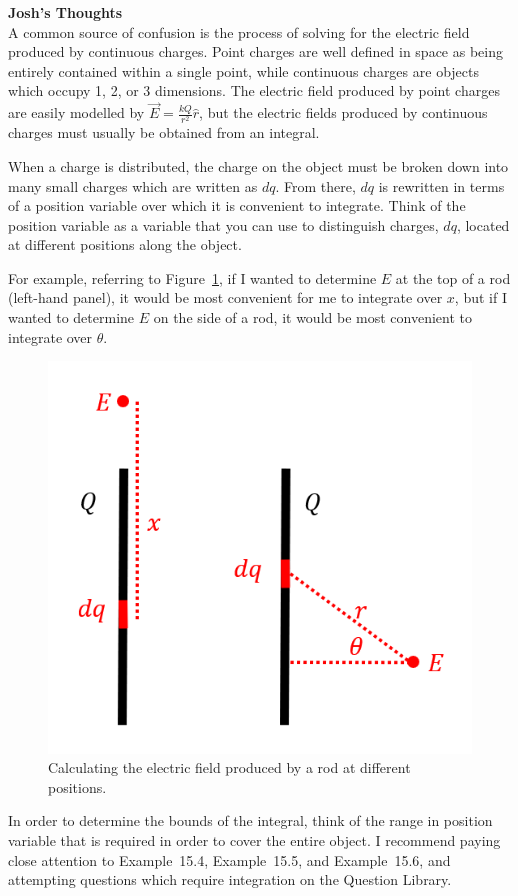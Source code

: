 \begin{framed}
\textbf{Josh's Thoughts}\\
A common source of confusion is the process of solving for the electric field produced by continuous charges. Point charges are well defined in space as being entirely contained within a single point, while continuous charges are objects which occupy 1, 2, or 3 dimensions. The electric field produced by point charges are easily modelled by $\vec E = \frac{kQ}{r^2}\hat r$, but the electric fields produced by continuous charges must usually be obtained from an integral.

When a charge is distributed, the charge on the object must be broken down into many small charges which are written as $dq$. From there, $dq$ is rewritten in terms of a position variable over which it is convenient to integrate. Think of the position variable as a variable that you can use to distinguish charges, $dq$, located at different positions along the object.

For example, referring to Figure~\ref{fig:chargesfields:rodexample}, if I wanted to determine $E$ at the top of a rod (left-hand panel), it would be most convenient for me to integrate over $x$, but if I wanted to determine $E$ on the side of a rod, it would be most convenient to integrate over $\theta$.

\begin{figure}[!htbp]
\centering
\includegraphics[width=0.4\linewidth]{files/rodexample-76239b7407f7a41e29db62973439260f.png}
\caption[]{Calculating the electric field produced by a rod at different positions.}
\label{fig:chargesfields:rodexample}
\end{figure}

In order to determine the bounds of the integral, think of the range in position variable that is required in order to cover the entire object. I recommend paying close attention to Example~15.4, Example~15.5, and Example~15.6, and attempting questions which require integration on the Question Library.
\end{framed}

